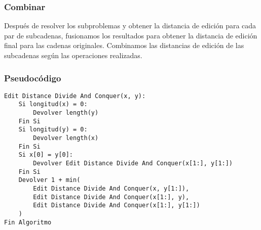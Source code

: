 \subsubsection*{Combinar}
Después de resolver los subproblemas y obtener la distancia de edición para cada par de subcadenas, fusionamos los resultados para obtener la distancia de edición final para las cadenas originales. Combinamos las distancias de edición de las subcadenas según las operaciones realizadas.

\subsubsection*{Pseudocódigo}
\begin{verbatim}
Edit Distance Divide And Conquer(x, y):
    Si longitud(x) = 0:
        Devolver length(y)
    Fin Si
    Si longitud(y) = 0:
        Devolver length(x)
    Fin Si
    Si x[0] = y[0]:
        Devolver Edit Distance Divide And Conquer(x[1:], y[1:])
    Fin Si
    Devolver 1 + min(
        Edit Distance Divide And Conquer(x, y[1:]),
        Edit Distance Divide And Conquer(x[1:], y),
        Edit Distance Divide And Conquer(x[1:], y[1:])
    )
Fin Algoritmo
\end{verbatim}

